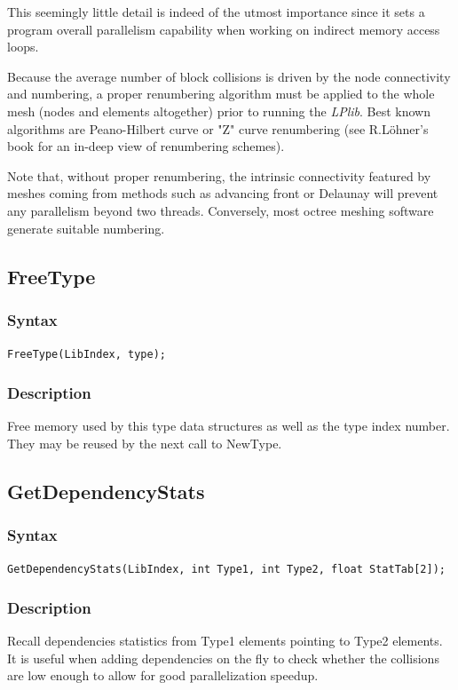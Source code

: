 \documentclass[a4paper,12pt]{article}
\begin{document}
This seemingly little detail is indeed of the utmost importance since it sets a program overall parallelism capability when working on indirect memory access loops.

Because the average number of block collisions is driven by the node connectivity and numbering, a proper renumbering algorithm must be applied to the whole mesh (nodes and elements altogether) prior to running the \emph{LPlib}. Best known algorithms are Peano-Hilbert curve or "Z" curve renumbering (see R.Löhner's book \cite {lohner} for an in-deep view of renumbering schemes).

Note that, without proper renumbering, the intrinsic connectivity featured by meshes coming from methods such as advancing front or Delaunay will prevent any parallelism beyond two threads. Conversely, most octree meshing software generate suitable numbering.


\subsection{FreeType}

\subsubsection*{Syntax}
\tt{FreeType(LibIndex, type);}
\normalfont

\subsubsection*{Description}
Free memory used by this type data structures as well as the type index number. They may be reused by the next call to NewType.


\subsection{GetDependencyStats}

\subsubsection*{Syntax}
\tt{GetDependencyStats(LibIndex, int Type1, int Type2, float StatTab[2]);}
\normalfont

\subsubsection*{Description}
Recall dependencies statistics from Type1 elements pointing to Type2 elements. It is useful when adding dependencies on the fly to check whether the collisions are low enough to allow for good parallelization speedup.
\end{document}
